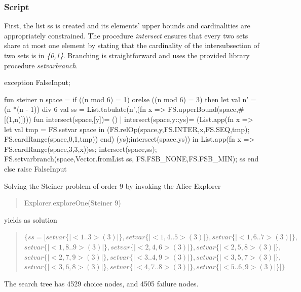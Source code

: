 \documentclass[a4paper,halfparskip]{scrartcl}
\begin{document}
\subsubsection{Script}
First, the list ss is created and its elements' upper bounds 
and cardinalities are appropriately constrained. 
The procedure \emph{intersect} ensures
that every two sets share at most one element by stating that 
the cardinality of the intersubsection of two sets is in \emph{\{0,1\}}. 
Branching is straightforward and uses the provided library 
procedure \emph{setvarbranch}.
  
\begin{myverbatim}
exception FalseInput;

fun steiner n space  = 
   if ((n mod 6) = 1) orelse ((n mod 6) = 3)
   then
    let 
       val n' = (n *(n - 1)) div 6
       val ss = List.tabulate(n',(fn x => 
                  FS.upperBound(space,#[(1,n)])))
       fun intersect(space,[y])= ()
         | intersect(space,y::ys)= (List.app(fn x =>
              let 
                 val tmp = FS.setvar space
              in       
                (FS.relOp(space,y,FS.INTER,x,FS.SEQ,tmp);
                 FS.cardRange(space,0,1,tmp))
             end)
                (ys);intersect(space,ys))
    in
       List.app(fn x => FS.cardRange(space,3,3,x))ss;
       intersect(space,ss);
       FS.setvarbranch(space,Vector.fromList ss,
                             FS.FSB_NONE,FS.FSB_MIN);    
       ss
    end
    else                 
     raise FalseInput 
\end{myverbatim}


Solving the Steiner problem of order 9 by invoking the Alice 
Explorer 
\begin{quote}
Explorer.exploreOne(Steiner 9)
\end{quote}
yields as solution 
\begin{quote}
$\{ss = [setvar\{|<1..3> (3)|\}, setvar\{|<1, 4..5> (3)|\},setvar\{|<1, 6..7> (3)|\},$ \\
$       setvar\{|<1, 8..9> (3)|\}, setvar\{|<2, 4, 6> (3)|\},  setvar\{|<2, 5, 8> (3)|\},$\\
$  setvar\{|<2, 7, 9> (3)|\},  setvar\{|<3..4, 9> (3)|\},  setvar\{|<3, 5, 7> (3)|\}, $\\
$ setvar\{|<3, 6, 8> (3)|\},  setvar\{|<4, 7..8> (3)|\},  setvar\{|<5..6, 9> (3)|\}]\}$
\end{quote}
The search tree has 4529 choice nodes, and 4505 
failure nodes. 
\end{document}
